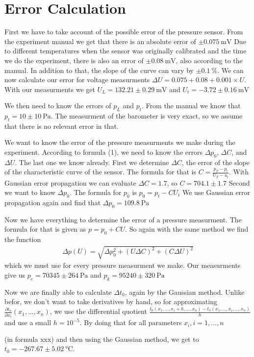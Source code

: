\section{Error Calculation}
First we have to take account of the possible error of the pressure sensor. From the experiment manual we get that there is an absolute error of $\pm\SI{0.075}{\milli\volt}$ Due to different temperatures when the sensor was originally calibrated and the time we do the experiment, there is also an error of $\pm\SI{0.08}{\milli\volt}$, also according to the manual. In addition to that, the slope of the curve can vary by $\pm\SI{0.1}{\percent}$. We can now calculate our error for voltage measurments $\Delta U = 0.075 + 0.08 + 0.001 \times U$. With our measurments we get $U_L = 132.21 \pm \SI{0.29}{\milli\volt}$ and $U_t = -3.72 \pm \SI{0.16}{\milli\volt}$

We then need to know the errors of $p_L$ and $p_t$. From the manual we know that $p_t = 10 \pm \SI{10}{\pascal}$.
The measurment of the barometer is very exact, so we assume that there is no relevant error in that. 

We want to know the error of the pressure measurments we make during the experiment. According to formula (1), we need to know the errors $\Delta p_0$, $\Delta C$, and $\Delta U$. The last one we know already.
First we determine $\Delta C$, the error of the slope of the characteristic curve of the sensor. The formula for that is $C = \frac{p_T - p_l}{U_T - u_l}$. With Gaussian error propagation we can evaluate $\Delta C = 1.7$, so $C = 704.1 \pm 1.7$
Second we want to know $\Delta p_0$. The formula for $p_0$ is $p_0 = p_t - C U_t$ We use Gaussian error propagation again and find that $\Delta p_0 = \SI{109.8}{\pascal}$

Now we have everything to determine the error of a pressure measurment. The formula for that is given as $p = p_0 + C U$. So again with the same method we find the function 
\begin{align}
	\Delta p(U) = \sqrt{\Delta p_0^2 + (U \Delta C)^2 + (C \Delta U)^2}
\end{align}
which we must use for every pressure measurment we make. Our measurments give us $p_e = 70345 \pm \SI{264}{\pascal}$ and $p_k = 95240 \pm \SI{320}{\pascal}$

Now we are finally able to calculate $\Delta t_0$, again by the Gaussian method. Unlike befor, we don't want to take derivatives by hand, so for approximating $\frac{\partial t_0}{\partial x_i}(x_1, ..., x_n)$, we use the differential quotient $\frac{t_0(x_1,..., x_i+h,...,x_n) - t_0(x_1,..., x_i,...,x_n)}{h}$ and use a small $h = 10^{-5}$. By doing that for all parameters $x_i, i = 1,...,n$

(in formula xxx)
and then using the Gaussian method, we get to $t_0 = -267.67 \pm \SI{5.02}{\degreeCelsius}$.